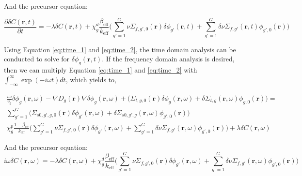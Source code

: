 And the precursor equation:

\begin{equation}
        \frac{\partial \delta C(\textbf{r}, t)}{\partial t} = - \lambda \delta C(\textbf{r}, t) + \chi^d_g \frac{\beta_{\text{eff}}}{k_{\text{eff}}}\biggl(\sum_{g' = 1}^{G} \nu \Sigma_{f,g',0}(\textbf{r}) \delta \phi_{g'}(\textbf{r}, t) + \sum_{g' = 1}^{G} \delta \nu \Sigma_{f,g'}(\textbf{r}, t) \phi_{g',0}(\textbf{r}) \biggr)
        \label{eq:time_2}
\end{equation}

Using Equation \ref{eq:time_1} and \ref{eq:time_2}, the time domain analysis can be conducted to solve for $\delta \phi_g (\textbf{r}, t)$. If the frequency domain analysis is desired, then we can multiply Equation \ref{eq:time_1} and \ref{eq:time_2} with $\int_{-\infty}^{\infty} \exp (-i \omega t) dt$, which yields to,

\begin{equation}
        \begin{aligned}
                \frac{i \omega}{v_g} \delta \phi_g (\textbf{r}, \omega) - \nabla D_g(\textbf{r}) \nabla \delta \phi_g(\textbf{r}, \omega) + \biggl(\Sigma_{t,g,0}(\textbf{r}) \delta \phi_g(\textbf{r}, \omega) + \delta \Sigma_{t,g}(\textbf{r}, \omega) \phi_{g,0}(\textbf{r}) \biggr) = \\
                \sum_{g' = 1}^{G} \biggl(\Sigma_{s0,g',g,0}(\textbf{r}) \delta \phi_{g'}(\textbf{r}, \omega) + \delta \Sigma_{s0,g',g}(\textbf{r}, \omega) \phi_{g',0}(\textbf{r}) \biggr)\\
                \chi^p_g \frac{1-\beta_{\text{eff}}}{k_{\text{eff}}} \biggl(\sum_{g' = 1}^{G} \nu \Sigma_{f,g',0}(\textbf{r}) \delta \phi_{g'}(\textbf{r}, \omega) + \sum_{g' = 1}^{G} \delta \nu \Sigma_{f,g'}(\textbf{r}, \omega) \phi_{g',0}(\textbf{r}) \biggr) + \lambda \delta C(\textbf{r}, \omega)
        \end{aligned}
        \label{eq:freq_1}
\end{equation}

And the precursor equation:
\begin{equation}
        i \omega \delta C(\textbf{r}, \omega) = - \lambda \delta C(\textbf{r}, \omega) + \chi^d_g \frac{\beta_{\text{eff}}}{k_{\text{eff}}}\biggl(\sum_{g' = 1}^{G} \nu \Sigma_{f,g',0}(\textbf{r}) \delta \phi_{g'}(\textbf{r}, \omega) + \sum_{g' = 1}^{G} \delta \nu \Sigma_{f,g'}(\textbf{r}, \omega) \phi_{g',0}(\textbf{r}) \biggr)
        \label{eq:freq_2}
\end{equation}

